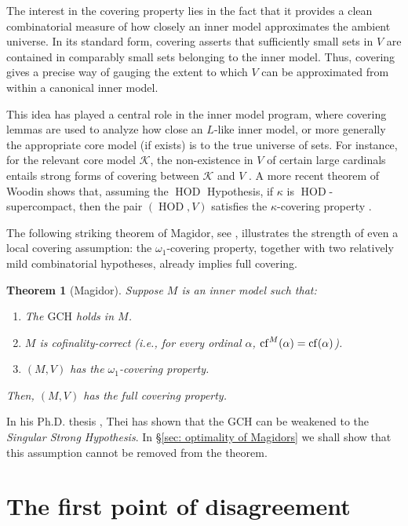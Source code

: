 \documentclass[11pt]{amsart}
\newtheorem{theorem}{Theorem}[section]
\theoremstyle{definition}
\theoremstyle{remark}
\DeclareMathOperator{\HOD}{HOD}
\newcommand{\cf}{{\rm cf}}
\begin{document}
The interest in the covering property lies in the fact that it provides a clean combinatorial measure of how closely an inner model approximates the ambient universe. In its standard form, covering asserts that sufficiently small sets in $V$ are contained in comparably small sets belonging to the inner model. Thus, covering gives a precise way of gauging the extent to which $V$ can be approximated from within a canonical inner model.

This idea has played a central role in the inner model program, where covering lemmas are used to analyze how close an $L$-like inner model, or more generally the appropriate core model (if exists)  is to the true universe of sets. For instance, for the relevant core model $\mathcal K$, the non-existence in $V$ of certain large cardinals entails strong forms of covering between $\mathcal K$ and $V$ \cite{MitchellHandbook,SteelHandbook}. A more recent theorem of Woodin shows that, assuming the $\HOD$ Hypothesis, if $\kappa$ is $\HOD$-supercompact, then the pair $(\HOD,V)$ satisfies the $\kappa$-covering property \cite{WoodinPartI}.

\smallskip

The following striking theorem of Magidor, see \cite[Theorem 2.33]{AbrahamMagidor}, illustrates the strength of even a local covering assumption: the $\omega_1$-covering property, together with two relatively mild combinatorial hypotheses, already implies full covering.


\begin{theorem}[Magidor]\label{thm: Magidor}
    Suppose $M$ is an inner model such that:
    \begin{enumerate}
        \item The $\mathrm{GCH}$ holds in $M$.
        \item $M$ is cofinality-correct (i.e., for every ordinal $\alpha$, $\cf^M(\alpha)=\cf(\alpha)$).
        \item $(M,V)$ has the $\omega_1$-covering property. 
    \end{enumerate}
    Then, $(M,V)$ has the full covering property.
\end{theorem}
In his Ph.D. thesis \cite{SebaPhD}, Thei has shown that the GCH can be weakened to the \emph{Singular Strong Hypothesis}. In \S\ref{sec: optimality of Magidors} we shall show that this assumption cannot be removed from the theorem.


\section{The first point of disagreement}\label{sec: compactness HOD}
\end{document}
